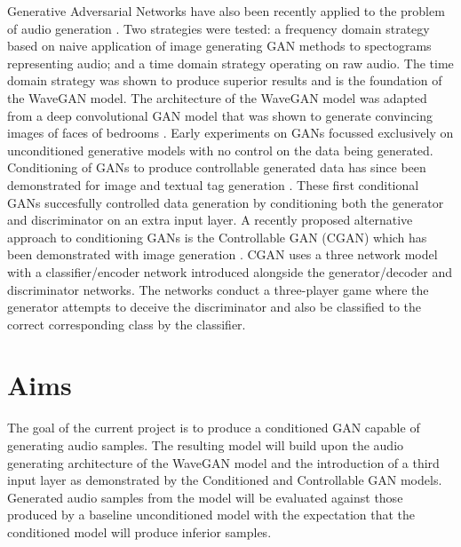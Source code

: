 \documentclass[a4paper, titlepage]{article}
\begin{document}
\newline
\newline
Generative Adversarial Networks have also been recently applied to the problem of audio generation \cite{2018arXiv180204208D}.
Two strategies were tested: a frequency domain strategy based on naive application of image generating GAN methods to spectograms representing audio; and a time domain strategy operating on raw audio.
The time domain strategy was shown to produce superior results and is the foundation of the WaveGAN model.
The architecture of the WaveGAN model was adapted from a deep convolutional GAN model that was shown to generate convincing images of faces of bedrooms \cite{2015arXiv151106434R}.
\newline
\newline
Early experiments on GANs focussed exclusively on unconditioned generative models with no control on the data being generated.
Conditioning of GANs to produce controllable generated data has since been demonstrated for image and textual tag generation \cite{2014arXiv1411.1784M}.
These first conditional GANs succesfully controlled data generation by conditioning both the generator and discriminator on an extra input layer.
\newline
\newline
A recently proposed alternative approach to conditioning GANs is the Controllable GAN (CGAN) which has been demonstrated with image generation \cite{2017arXiv170800598L}.
CGAN uses a three network model with a classifier/encoder network introduced alongside the generator/decoder and discriminator networks.
The networks conduct a three-player game where the generator attempts to deceive the discriminator and also be classified to the correct corresponding class by the classifier.

\newpage

\section{Aims}

The goal of the current project is to produce a conditioned GAN capable of generating audio samples.
The resulting model will build upon the audio generating architecture of the WaveGAN model and the introduction of a third input layer as demonstrated by the Conditioned and Controllable GAN models.
Generated audio samples from the model will be evaluated against those produced by a baseline unconditioned model with the expectation that the conditioned model will produce inferior samples.
\end{document}
